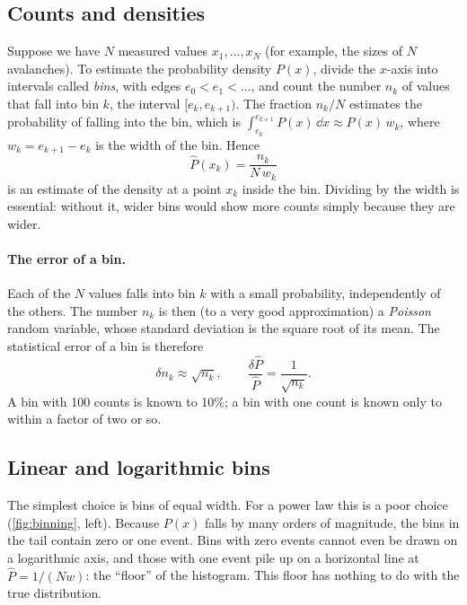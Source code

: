 \subsection{Counts and densities}

Suppose we have $N$ measured values $x_1,\dots,x_N$ (for example, the sizes of $N$ avalanches). To estimate
the probability density $P(x)$, divide the $x$-axis into intervals called \emph{bins}, with edges
$e_0<e_1<\dots$, and count the number $n_k$ of values that fall into bin $k$, the interval $[e_k,e_{k+1})$.
The fraction $n_k/N$ estimates the probability of falling into the bin, which is $\int_{e_k}^{e_{k+1}}P(x)\,\dd x
\approx P(x)\,w_k$, where $w_k = e_{k+1}-e_k$ is the width of the bin. Hence
\begin{equation}
  \hat P(x_k) = \frac{n_k}{N\,w_k}
  \label{eq:hist}
\end{equation}
is an estimate of the density at a point $x_k$ inside the bin. Dividing by the width is essential: without
it, wider bins would show more counts simply because they are wider.

\paragraph{The error of a bin.} Each of the $N$ values falls into bin $k$ with a small probability, independently
of the others. The number $n_k$ is then (to a very good approximation) a \emph{Poisson} random variable, whose
standard deviation is the square root of its mean. The statistical error of a bin is therefore
\begin{equation}
  \delta n_k \approx \sqrt{n_k}, \qquad \frac{\delta\hat P}{\hat P} = \frac{1}{\sqrt{n_k}}.
\end{equation}
A bin with 100 counts is known to 10\%; a bin with one count is known only to within a factor of two or so.

\subsection{Linear and logarithmic bins}

The simplest choice is bins of equal width. For a power law this is a poor choice (\cref{fig:binning}, left).
Because $P(x)$ falls by many orders of magnitude, the bins in the tail contain zero or one event. Bins with
zero events cannot even be drawn on a logarithmic axis, and those with one event pile up on a horizontal line
at $\hat P = 1/(Nw)$: the ``floor'' of the histogram. This floor has nothing to do with the true distribution.

